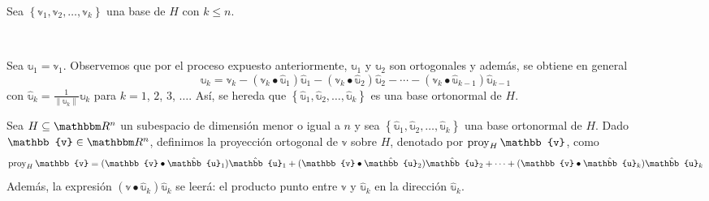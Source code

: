 \begin{observation}
    Sea $\left\{ \mathbb{v}_1, \mathbb{v}_2, \dots, \mathbb{v}_k \right\}$ una base de $H$ con $k \leq n$.
    \begin{figure}[h!]
        \centering
        \caption{~}
    \end{figure}
    
    \noindent Sea $\mathbb{u}_1 = \mathbb{v}_1$. Observemos que por el proceso expuesto anteriormente, $\mathbb{u}_1$ y $\mathbb{u}_2$ son ortogonales y además, se obtiene en general
    \begin{equation}
        \mathbb{u}_k = \mathbb{v}_k - (\mathbb{v}_k \bullet \hat{\mathbb{u}}_1)\hat{\mathbb{u}}_1 - (\mathbb{v}_k \bullet \hat{\mathbb{u}}_2)\hat{\mathbb{u}}_2 - \cdots - (\mathbb{v}_k \bullet \hat{\mathbb{u}}_{k-1})\hat{\mathbb{u}}_{k-1} \label{GRAM}
    \end{equation}
    con $\displaystyle \hat{\mathbb{u}}_k = \frac{1}{\| \mathbb{u}_k \|} \mathbb{u}_k$ para $k = 1$, $2$, $3$, $\dots$. Así, se hereda que $\left\{ \hat{\mathbb{u}}_1, \hat{\mathbb{u}}_2, \dots, \hat{\mathbb{u}}_k \right\}$ es una base ortonormal de $H$.
\end{observation}

\begin{definition}
    Sea $H \subseteq \RR[n]$ un subespacio de dimensión menor o igual a $n$ y sea $\left\{ \hat{\mathbb{u}}_1, \hat{\mathbb{u}}_2, \dots, \hat{\mathbb{u}}_k \right\}$ una base ortonormal de $H$. Dado $\mathbb{v} \in \RR[n]$, definimos la proyección ortogonal de $\mathbb{v}$ sobre $H$, denotado por $\proy_{H} \mathbb{v}$, como
    $$\proy_{H} \mathbb{v} = (\mathbb{v} \bullet \hat{\mathbb{u}}_1)\hat{\mathbb{u}}_1 + (\mathbb{v} \bullet \hat{\mathbb{u}}_2)\hat{\mathbb{u}}_2 + \cdots + (\mathbb{v} \bullet \hat{\mathbb{u}}_k)\hat{\mathbb{u}}_k$$
    Además, la expresión $(\mathbb{v} \bullet \hat{\mathbb{u}}_k)\hat{\mathbb{u}}_k$ se leerá: el producto punto entre $\mathbb{v}$ y $\hat{\mathbb{u}}_k$ en la dirección $\hat{\mathbb{u}}_k$.
\end{definition}


